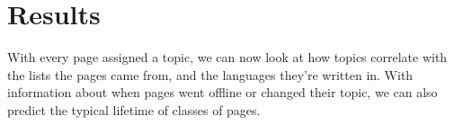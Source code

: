 \section{Results}\label{s:eval}

With every page assigned a topic, we can now look at how topics
correlate with the lists the pages came from, and the languages
they're written in.  With information about when pages went offline or
changed their topic, we can also predict the typical lifetime of
classes of pages.
















